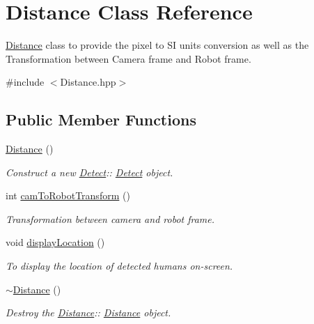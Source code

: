 \hypertarget{classDistance}{}\section{Distance Class Reference}
\label{classDistance}


\hyperlink{classDistance}{Distance} class to provide the pixel to SI units conversion as well as the Transformation between Camera frame and Robot frame.  




{\ttfamily \#include $<$Distance.\+hpp$>$}

\subsection*{Public Member Functions}
\begin{DoxyCompactItemize}
\item 
\mbox{\label{classDistance_a10c71cb57a2a8f5c66b2e91f63e3595a}} 
\hyperlink{classDistance_a10c71cb57a2a8f5c66b2e91f63e3595a}{Distance} ()
\begin{DoxyCompactList}\small\item\em Construct a new \hyperlink{classDetect}{Detect}\+:\+: \hyperlink{classDetect}{Detect} object. \end{DoxyCompactList}\item 
\mbox{\label{classDistance_ac6d9ac2a81e7e3594a62ab46fa049093}} 
int \hyperlink{classDistance_ac6d9ac2a81e7e3594a62ab46fa049093}{cam\+To\+Robot\+Transform} ()
\begin{DoxyCompactList}\small\item\em Transformation between camera and robot frame. \end{DoxyCompactList}\item 
\mbox{\label{classDistance_aa11922ad85f7cdd6611a23d87840e7fb}} 
void \hyperlink{classDistance_aa11922ad85f7cdd6611a23d87840e7fb}{display\+Location} ()
\begin{DoxyCompactList}\small\item\em To display the location of detected humans on-\/screen. \end{DoxyCompactList}\item 
\mbox{\label{classDistance_a933d4ecca7e420ac53945e36d64e9500}} 
\hyperlink{classDistance_a933d4ecca7e420ac53945e36d64e9500}{$\sim$\+Distance} ()
\begin{DoxyCompactList}\small\item\em Destroy the \hyperlink{classDistance}{Distance}\+:\+: \hyperlink{classDistance}{Distance} object. \end{DoxyCompactList}\end{DoxyCompactItemize}


